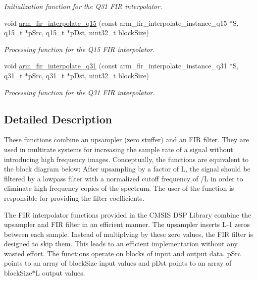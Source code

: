 \begin{DoxyCompactItemize}
\begin{DoxyCompactList}\small\item\em Initialization function for the Q31 F\+IR interpolator. \end{DoxyCompactList}\item 
void \hyperlink{group__FIR__Interpolate_ga7962b5f9636e54899f75d0c5936800b5}{arm\+\_\+fir\+\_\+interpolate\+\_\+q15} (const arm\+\_\+fir\+\_\+interpolate\+\_\+instance\+\_\+q15 $\ast$S, q15\+\_\+t $\ast$p\+Src, q15\+\_\+t $\ast$p\+Dst, uint32\+\_\+t block\+Size)
\begin{DoxyCompactList}\small\item\em Processing function for the Q15 F\+IR interpolator. \end{DoxyCompactList}\item 
void \hyperlink{group__FIR__Interpolate_gaac9c0f01ed91c53f7083995d7411f5ee}{arm\+\_\+fir\+\_\+interpolate\+\_\+q31} (const arm\+\_\+fir\+\_\+interpolate\+\_\+instance\+\_\+q31 $\ast$S, q31\+\_\+t $\ast$p\+Src, q31\+\_\+t $\ast$p\+Dst, uint32\+\_\+t block\+Size)
\begin{DoxyCompactList}\small\item\em Processing function for the Q31 F\+IR interpolator. \end{DoxyCompactList}\end{DoxyCompactItemize}


\subsection{Detailed Description}
These functions combine an upsampler (zero stuffer) and an F\+IR filter. They are used in multirate systems for increasing the sample rate of a signal without introducing high frequency images. Conceptually, the functions are equivalent to the block diagram below\+: After upsampling by a factor of {\ttfamily L}, the signal should be filtered by a lowpass filter with a normalized cutoff frequency of {/L} in order to eliminate high frequency copies of the spectrum. The user of the function is responsible for providing the filter coefficients.

The F\+IR interpolator functions provided in the C\+M\+S\+IS D\+SP Library combine the upsampler and F\+IR filter in an efficient manner. The upsampler inserts {\ttfamily L-\/1} zeros between each sample. Instead of multiplying by these zero values, the F\+IR filter is designed to skip them. This leads to an efficient implementation without any wasted effort. The functions operate on blocks of input and output data. {\ttfamily p\+Src} points to an array of {\ttfamily block\+Size} input values and {\ttfamily p\+Dst} points to an array of {\ttfamily block\+Size$\ast$L} output values.


